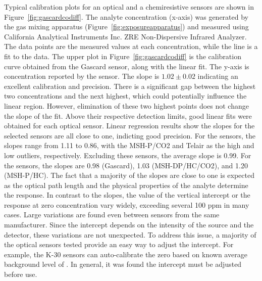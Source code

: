 \documentclass[sensors,article,submit,moreauthors,pdftex]{Definitions/mdpi}
\begin{document}
			Typical calibration plots for an optical and a chemiresistive sensors are shown in Figure~\ref{fig:gascardcodiff}.
			The analyte concentration (x-axis) was generated by the gas mixing apparatus (Figure~\ref{fig:exposureapparatus}) and measured using  California Analytical Instruments Inc. ZRE Non-Dispersive Infrared Analyzer.  
			The data points are the measured values at each concentration, while the line is a fit to the data.
			The upper plot in Figure~\ref{fig:gascardcodiff} is the  calibration curve obtained from the Gascard sensor, along with the linear fit.
			The y-axis is concentration reported by the sensor.
			The slope is $1.02\pm 0.02$ indicating an excellent calibration and precision.  
			There is a significant gap between the highest two  concentrations and the next highest, which could potentially influence the linear region.
			However, elimination of these two highest points does not change the slope of the fit.
			Above their respective detection limits, good linear fits were obtained for each optical sensor.
			Linear regression results show the slopes for the selected sensors are all close to one, indicting good precision.
			For the  sensors, the slopes range from 1.11 to 0.86, with the MSH-P/CO2 and Telair as the high and low outliers, respectively.
			Excluding these sensors, the average slope is 0.99.
			For the  sensors, the slopes are 0.98 (Gascard), 1.03 (MSH-DP/HC/CO2), and 1.20 (MSH-P/HC).
			The fact that a majority of the slopes are close to one is expected as the optical path length and the physical properties of the analyte determine the response.
			In contrast to the slopes, the value of the vertical intercept or the response at zero concentration vary widely, exceeding several 100 ppm in many cases.
			Large variations are found even between sensors from the same manufacturer.
			Since the intercept depends on the intensity of the source and the detector, these variations are not unexpected.
			To address this issue, a majority of the optical sensors tested provide an easy way to adjust the intercept.
			For example, the K-30 sensors can auto-calibrate the zero based on known average background level of .
			In general, it was found the intercept must be adjusted before use.
			
\end{document}
